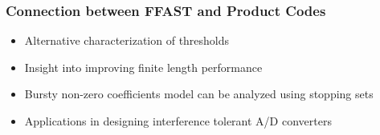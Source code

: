 \documentclass[10pt,xcolor=table]{beamer}
\begin{document}
\begin{frame}\frametitle{Connection between FFAST and Product Codes}
\begin{itemize}
\item Alternative characterization of thresholds
\item Insight into improving finite length performance
\item Bursty non-zero coefficients model can be analyzed using stopping sets
\item Applications in designing interference tolerant A/D converters
\end{itemize}
\end{frame}
\end{document}
